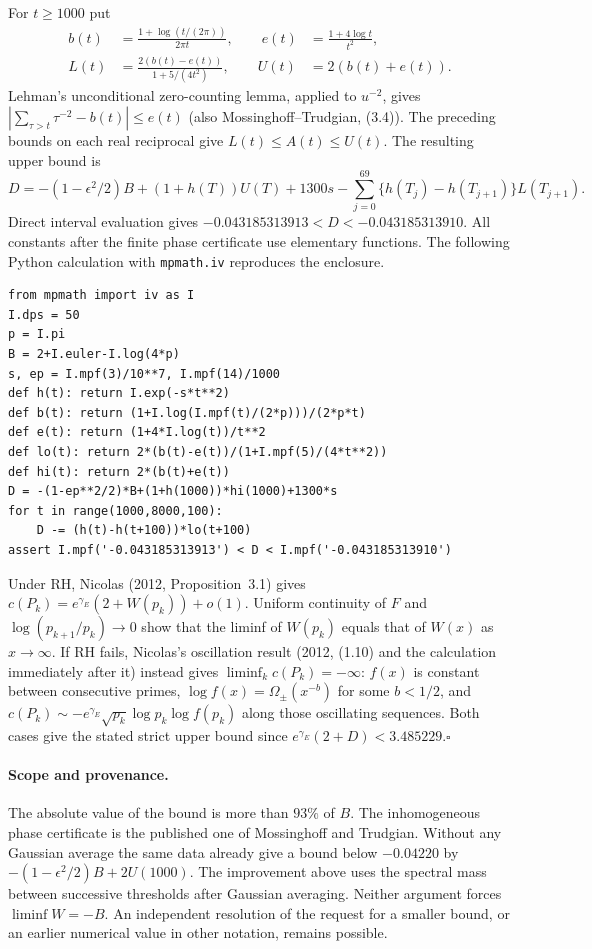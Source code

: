 \documentclass[11pt,a4paper]{article}
\begin{document}
For $t\ge1000$ put
\[
 \begin{aligned} b(t)&=\frac{1+\log(t/(2\pi))}{2\pi t},\qquad
 e(t)&=\frac{1+4\log t}{t^2},\\
 L(t)&=\frac{2(b(t)-e(t))}{1+5/(4t^2)},\qquad U(t)&=2(b(t)+e(t)).\end{aligned}
\]
Lehman's unconditional zero-counting lemma, applied to $u^{-2}$, gives
$|\sum_{\tau>t}\tau^{-2}-b(t)|\le e(t)$
(also Mossinghoff--Trudgian, (3.4)). The preceding bounds on each
real reciprocal give $L(t)\le A(t)\le U(t)$. The resulting upper bound is
\[
 D=-(1-\epsilon^2/2)B+(1+h(T))U(T)+1300s-
 \sum_{j=0}^{69}\{h(T_j)-h(T_{j+1})\}L(T_{j+1}).
\]
Direct interval evaluation gives
$-0.043185313913<D<-0.043185313910$.
All constants after the finite phase certificate use elementary functions.
The following Python calculation with \texttt{mpmath.iv} reproduces the enclosure.
\begin{verbatim}
from mpmath import iv as I
I.dps = 50
p = I.pi
B = 2+I.euler-I.log(4*p)
s, ep = I.mpf(3)/10**7, I.mpf(14)/1000
def h(t): return I.exp(-s*t**2)
def b(t): return (1+I.log(I.mpf(t)/(2*p)))/(2*p*t)
def e(t): return (1+4*I.log(t))/t**2
def lo(t): return 2*(b(t)-e(t))/(1+I.mpf(5)/(4*t**2))
def hi(t): return 2*(b(t)+e(t))
D = -(1-ep**2/2)*B+(1+h(1000))*hi(1000)+1300*s
for t in range(1000,8000,100):
    D -= (h(t)-h(t+100))*lo(t+100)
assert I.mpf('-0.043185313913') < D < I.mpf('-0.043185313910')
\end{verbatim}
Under RH, Nicolas (2012, Proposition~3.1) gives
$c(P_k)=e^{\gamma_E}(2+W(p_k))+o(1)$. Uniform continuity of $F$ and
$\log(p_{k+1}/p_k)\to0$ show that the liminf of $W(p_k)$ equals that of
$W(x)$ as $x\to\infty$. If RH fails, Nicolas's oscillation result (2012,
(1.10) and the calculation immediately after it) instead gives
$\liminf_k c(P_k)=-\infty$: $f(x)$ is constant between consecutive primes,
$\log f(x)=\Omega_{\pm}(x^{-b})$ for some $b<1/2$, and
$c(P_k)\sim-e^{\gamma_E}\sqrt{p_k}\log p_k\log f(p_k)$ along those
oscillating sequences. Both cases give the stated strict upper bound
since $e^{\gamma_E}(2+D)<3.485229$.\hfill$\square$

\paragraph{Scope and provenance.}
The absolute value of the bound is more than $93\%$ of $B$.
The inhomogeneous phase certificate is the published one of
Mossinghoff and Trudgian. Without any Gaussian average the same data
already give a bound below $-0.04220$ by $-(1-\epsilon^2/2)B+2U(1000)$.
The improvement above uses the spectral mass between successive
thresholds after Gaussian averaging. Neither argument forces
$\liminf W=-B$. An independent resolution of the request for a smaller
bound, or an earlier numerical value in other notation, remains possible.
\end{document}
